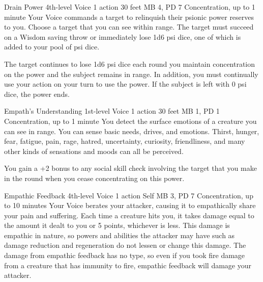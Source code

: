\DndPowerHeader%
  {Drain Power}
  {4th-level Voice}
  {1 action}
  {30 feet}
  {MB 4, PD 7}
  {Concentration, up to 1 minute}
Your Voice commands a target to relinquish their psionic power
reserves to you.
Choose a target that you can see within range.
The target must succeed on a Wisdom saving throw
or immediately lose 1d6 psi dice, one of which is added
to your pool of psi dice.

The target continues to lose 1d6 psi dice each round you
maintain concentration on the power and the subject remains
in range.
In addition, you must continually use your action on your turn
to use the power.
If the subject is left with 0 psi dice, the power ends.

\DndPowerHeader%
  {Empath's Understanding}
  {1st-level Voice}
  {1 action}
  {30 feet}
  {MB 1, PD 1}
  {Concentration, up to 1 minute}
You detect the surface emotions of a creature you can see in range.
You can sense basic needs, drives, and emotions.
Thirst, hunger, fear, fatigue, pain, rage, hatred, uncertainty,
curiosity, friendliness, and many other kinds of sensations and moods
can all be perceived.

You gain a +2 bonus to any social skill check involving the target
that you make in the round when you cease concentrating on this power.

\DndPowerHeader%
  {Empathic Feedback}
  {4th-level Voice}
  {1 action}
  {Self}
  {MB 3, PD 7}
  {Concentration, up to 10 minutes}
Your Voice berates your attacker,
causing it to empathically share your pain and suffering.
Each time a creature hits you,
it takes damage equal to the amount it dealt to you or 5 points,
whichever is less.
This damage is empathic in nature,
so powers and abilities the attacker may have such as damage reduction
and regeneration do not lessen or change this damage.
The damage from empathic feedback has no type,
so even if you took fire damage from a creature
that has immunity to fire,
empathic feedback will damage your attacker.

